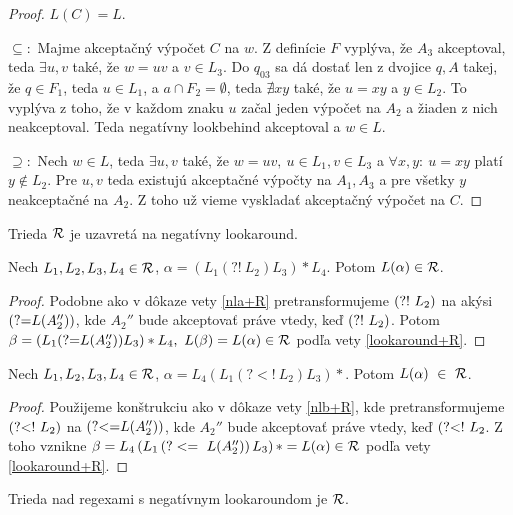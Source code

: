 \begin{proof}
$L(C)=L.$

$\subseteq:$
Majme akceptačný výpočet $C$ na $w$. Z definície $F$ vyplýva, že $A_3$ akceptoval, teda $\exists u,v$ také, že $w=uv$ a $v \in L_3$. Do $q_{03}$ sa dá dostať len z dvojice $q,A$ takej, že $q\in F_1$, teda $u\in L_1$, a $a \cap F_2 = \emptyset$, teda $\nexists xy$ také, že $u=xy$ a $y \in L_2$. To vyplýva z toho, že v každom znaku $u$ začal jeden výpočet na $A_2$ a žiaden z nich neakceptoval. Teda negatívny lookbehind akceptoval a $w\in L$.

$\supseteq:$
Nech $w\in L$, teda $\exists u,v$ také, že $w=uv,~ u \in L_1, v\in L_3$ a $\forall x,y:~u=xy$ platí $y \notin L_2$. Pre $u,v$ teda existujú akceptačné výpočty na $A_1,A_3$ a pre všetky $y$ neakceptačné na $A_2$. Z toho už vieme vyskladať akceptačný výpočet na $C$.
\end{proof}

\begin{veta}
Trieda ${\cal R}$ je uzavretá na negatívny lookaround.
\end{veta}

\begin{lema}
Nech $L_1,L_2,L_3,L_4 \in {\cal R}$, $\alpha = \left( L_1 \left( ?!~ L_2\right) L_3 \right) * L_4$. Potom $L(\alpha) \in {\cal R}$.
\end{lema} 
\begin{proof}
Podobne ako v dôkaze vety \ref{nla+R} pretransformujeme $\text{(?!~} L_2)$ na akýsi $\text{(?=} L(A_2''))$, kde $A_2''$ bude akceptovať práve vtedy, keď $\text{(?!~} L_2)$. Potom $\beta = \left( L_1 \text{(?=} L(A_2'') ) L_3 \right) * L_4, ~ L(\beta) = L(\alpha) \in {\cal R}$ podľa vety \ref{lookaround+R}.
\end{proof}

\begin{lema}
Nech $L_1,L_2,L_3,L_4 \in {\cal R}$, $\alpha = L_4 \left( L_1 \left(?<!~ L_2\right) L_3 \right) *$. Potom $L(\alpha)~\in~{\cal R}$.
\end{lema} 
\begin{proof}
Použijeme konštrukciu ako v dôkaze vety \ref{nlb+R}, kde pretransformujeme $\text{(?\textless !~} L_2)$ na $\text{(?\textless =} L(A_2''))$, kde $A_2''$ bude akceptovať práve vtedy, keď $\text{(?\textless !~} L_2$. Z toho vznikne $\beta = L_4 \left( L_1 \left(?<=~ L(A_2'')\right) L_3 \right) * = L(\alpha) \in {\cal R}$ podľa vety \ref{lookaround+R}.
\end{proof}

\begin{veta}\label{nlookaround+R}
Trieda nad regexami s negatívnym lookaroundom je ${\cal R}$.
\end{veta}


